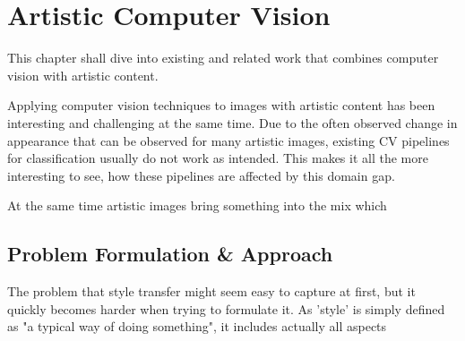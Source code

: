 \setchapterpreamble[u]{\margintoc}
\chapter{Artistic Computer Vision}
This chapter shall dive into existing and related work that combines computer vision with artistic content.

Applying computer vision techniques to images with artistic content has been interesting and challenging at the same time.
Due to the often observed change in appearance that can be observed for many artistic images, existing CV pipelines for \ie classification usually do not work as intended.
This makes it all the more interesting to see, how these pipelines are affected by this domain gap.

At the same time artistic images bring something into the mix which 








\section{Problem Formulation \& Approach}
The problem that style transfer might seem easy to capture at first, but it quickly becomes harder when trying to formulate it.
As 'style' is simply defined as "a typical way of doing something", it includes actually all aspects 

